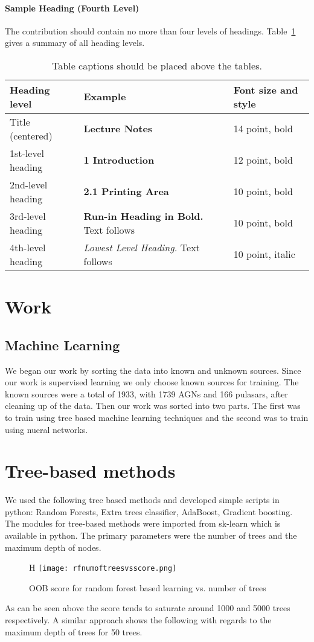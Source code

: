 \documentclass[runningheads]{llncs}
\begin{document}
\paragraph{Sample Heading (Fourth Level)}
The contribution should contain no more than four levels of
headings. Table~\ref{tab1} gives a summary of all heading levels.

\begin{table}
\caption{Table captions should be placed above the
tables.}\label{tab1}
\begin{tabular}{|l|l|l|}
\hline
Heading level &  Example & Font size and style\\
\hline
Title (centered) &  {\Large\bfseries Lecture Notes} & 14 point, bold\\
1st-level heading &  {\large\bfseries 1 Introduction} & 12 point, bold\\
2nd-level heading & {\bfseries 2.1 Printing Area} & 10 point, bold\\
3rd-level heading & {\bfseries Run-in Heading in Bold.} Text follows & 10 point, bold\\
4th-level heading & {\itshape Lowest Level Heading.} Text follows & 10 point, italic\\
\hline
\end{tabular}
\end{table}
\section{Work}
\subsection{Machine Learning}

We began our work by sorting the data into known and unknown sources. Since our work is supervised learning we only choose known sources for training. The known sources were a total of 1933, with 1739 AGNs and 166 pulasars, after cleaning up of the data. Then our work was sorted into two parts. The first was to train using tree based machine learning techniques and the second was to train using nueral networks. 

\section{Tree-based methods}

We used the following tree based methods and developed simple scripts in python: Random Forests, Extra trees classifier, AdaBoost, Gradient boosting. The modules for tree-based methods were imported from sk-learn which is available in python. The primary parameters were the number of trees and the maximum depth of nodes. \\
\begin{figure}{H}
\texttt{[image: rfnumoftreesvsscore.png]}
\caption{OOB score for random forest based learning vs. number of trees}
\end{figure}
As can be seen above the score tends to saturate around 1000 and 5000 trees respectively. A similar approach shows the following with regards to the maximum depth of trees for 50 trees.\\
\end{document}
